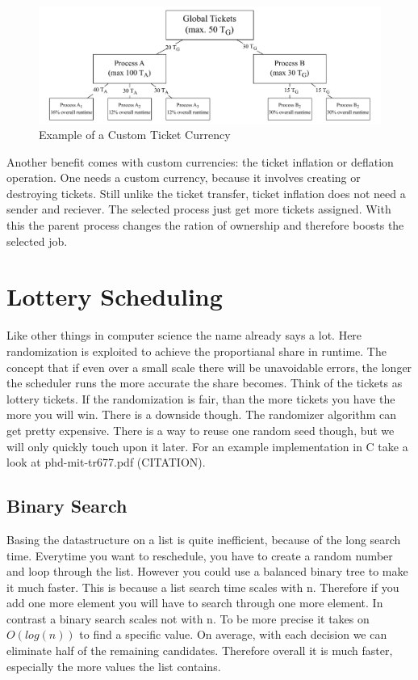 \begin{figure}[h]
    \centering
    \includegraphics[width=\textwidth]{Assets/Ticket-Currency.pdf}
    \caption{Example of a Custom Ticket Currency}
    \label{fig:ticket-currencies}
\end{figure}
 
Another benefit comes with custom currencies: the ticket inflation or deflation operation.
One needs a custom currency, because it involves creating or destroying tickets. 
Still unlike the ticket transfer, ticket inflation does not need a sender and reciever.
The selected process just get more tickets assigned.
With this the parent process changes the ration of ownership and therefore boosts the selected job.


\section{Lottery Scheduling}

Like other things in computer science the name already says a lot. 
Here randomization is exploited to achieve the proportianal share in runtime.
The concept that if even over a small scale there will be unavoidable errors, the longer the scheduler runs the more accurate the share becomes.
Think of the tickets as lottery tickets.
If the randomization is fair, than the more tickets you have the more you will win.
There is a downside though.
The randomizer algorithm can get pretty expensive.
There is a way to reuse one random seed though, but we will only quickly touch upon it later.
For an example implementation in C take a look at phd-mit-tr677.pdf (CITATION).

\subsection{Binary Search}

Basing the datastructure on a list is quite inefficient, because of the long search time.
Everytime you want to reschedule, you have to create a random number and loop through the list.
However you could use a balanced binary tree to make it much faster.
This is because a list search time scales with n. 
Therefore if you add one more element you will have to search through one more element.
In contrast a binary search scales not with n.
To be more precise it takes on $O(log(n))$ to find a specific value.
On average, with each decision we can eliminate half of the remaining candidates.
Therefore overall it is much faster, especially the more values the list contains.

